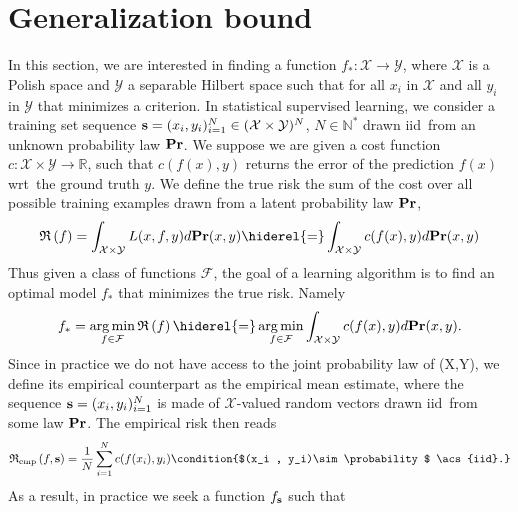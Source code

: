 
\section{Generalization bound}
\label{sec:generalization_bound}
In this section, we are interested in finding a function
$f_*:\mathcal{X}\to\mathcal{Y}$, where $\mathcal{X}$ is a Polish space and
$\mathcal{Y}$ a separable Hilbert space such that for all $x_i$ in
$\mathcal{X}$ and all $y_i$ in $\mathcal{Y}$ that minimizes a criterion. In
statistical supervised learning, we consider a training set sequence
$\boldsymbol{\mathbf{s}}=(x_i,y_i)_{i=1}^N\in(\mathcal{X}\times\mathcal{Y})^N$,
$N\in\mathbb{N^*}$ drawn \acs{iid}~from an unknown probability law
${\mathbf{{Pr}}}$. We suppose we are given a cost function
$c:\mathcal{X}\times\mathcal{Y}\to\mathbb{R}$, such that $c(f(x),y)$ returns
the error of the prediction $f(x)$ \acs{wrt}~the ground truth $y$. We define
the true risk the sum of the cost over all possible training examples drawn
from a latent probability law ${\mathbf{{Pr}}}$,
\begin{dmath*}
    \risk{f}=\int_{\mathcal{X}\times\mathcal{Y}}L(x,f,y)d\probability(x,y)
    \hiderel{=}\int_{\mathcal{X}\times\mathcal{Y}}c(f(x), y)d\probability(x,y)
\end{dmath*}
Thus given a class of functions $\mathcal{F}$, the goal of a learning algorithm
is to find an optimal model $f_*$ that minimizes the true risk. Namely
\begin{dmath*}
    f_* = \argmin_{f\in\mathcal{F}} \risk{f}
    \hiderel{=}\argmin_{f\in\mathcal{F}}\int_{\mathcal{X} \times
    \mathcal{Y}}c(f(x), y)d\probability(x,y).
\end{dmath*}
Since in practice we do not have access to the joint probability law of (X,Y),
we define its empirical counterpart as the empirical mean estimate, where the
sequence $\boldsymbol{\mathbf{s}}=(x_i,y_i)_{i=1}^N$ is made of $\mathcal{X}$-valued random
vectors drawn \acs{iid}~from some law
${\mathbf{{Pr}}}$.
The empirical risk then reads
\begin{dmath*}
    \riskemp{f, \seq{s}}=\frac{1}{N}\sum_{i=1}^Nc(f(x_i),y_i) \condition{$(x_i
    , y_i)\sim \probability$ \acs{iid}.}
\end{dmath*}
As a result, in practice we seek a function $f_{\boldsymbol{\mathbf{s}}}$ such that
